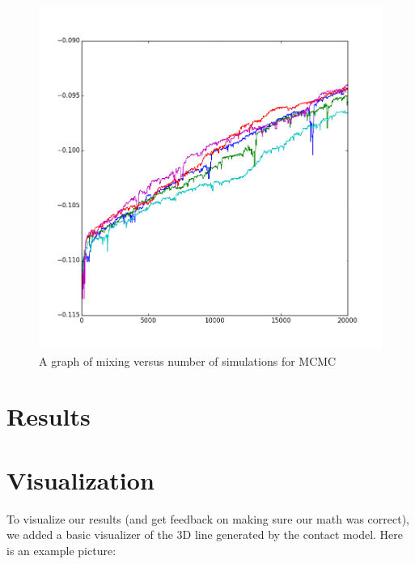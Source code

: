 \documentclass{article}
\begin{document}
\begin{figure}[H]
\begin{center}
\includegraphics[width=\textwidth]{chromo7}
\caption{A graph of mixing versus number of simulations for MCMC}
\label{Fig:blosum}
\end{center}
\end{figure}

\section{Results}



\section{Visualization}

To visualize our results (and get feedback on making sure our math was correct), we added a basic visualizer of the 3D line generated by the contact model.  Here is an example picture:
\end{document}
